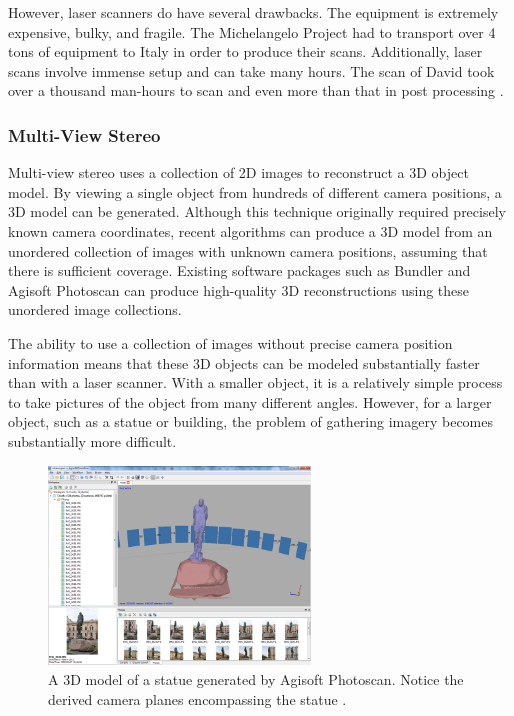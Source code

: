 \documentclass[pageno]{jpaper}
\begin{document}
However, laser scanners do have several drawbacks. The equipment is extremely expensive, bulky, and fragile. The Michelangelo Project had to transport over 4 tons of equipment to Italy in order to produce their scans. Additionally, laser scans involve immense setup and can take many hours. The scan of David took over a thousand man-hours to scan and even more than that in post processing \cite{Levoy}.


\subsubsection{Multi-View Stereo}
Multi-view stereo uses a collection of 2D images to reconstruct a 3D object model. By viewing a single object from hundreds of different camera positions, a 3D model can be generated. Although this technique originally required precisely known camera coordinates, recent algorithms can produce a 3D model from an unordered collection of images with unknown camera positions, assuming that there is sufficient coverage. Existing software packages such as Bundler and Agisoft Photoscan can produce high-quality 3D reconstructions using these unordered image collections. \cite{bundler}\cite{photoscan}

The ability to use a collection of images without precise camera position information means that these 3D objects can be modeled substantially faster than with a laser scanner. With a smaller object, it is a relatively simple process to take pictures of the object from many different angles. However, for a larger object, such as a statue or building, the problem of gathering imagery becomes substantially more difficult.

\begin{figure}
\centering
\includegraphics[height=200px]{../images/photoscan.png}
\caption{A 3D model of a statue generated by Agisoft Photoscan. Notice the derived camera planes encompassing the statue \cite{photoscan}.}
\end{figure}
\end{document}
